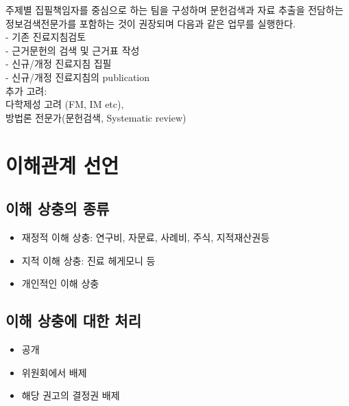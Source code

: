 \documentclass{paper}
\begin{document}
주제별 집필책임자를 중심으로 하는 팀을 구성하며 문헌검색과 자료 추출을 전담하는 정보검색전문가를 포함하는 것이 권장되며 다음과 같은 업무를 실행한다.\\[3ex]
- 기존 진료지침검토\\
- 근거문헌의 검색 및 근거표 작성\\
- 신규/개정 진료지침 집필\\
- 신규/개정 진료지침의 publication\\

추가 고려: \\
다학제성 고려 (FM, IM etc), \\
방법론 전문가(문헌검색, Systematic review)

%

\vspace{30pt}
\section{이해관계 선언}

\subsection{이해 상충의 종류}
\begin{itemize}
	\item 재정적 이해  상충: 연구비, 자문료, 사례비, 주식, 지적재산권등
	\item 지적 이해 상충: 진료 헤게모니 등 
	\item 개인적인 이해 상충
\end{itemize}

\subsection{이해 상충에 대한 처리}
\begin{itemize}
	\item 공개
	\item 위원회에서 배제
	\item 해당 권고의 결정권 배제
\end{itemize}
\end{document}
